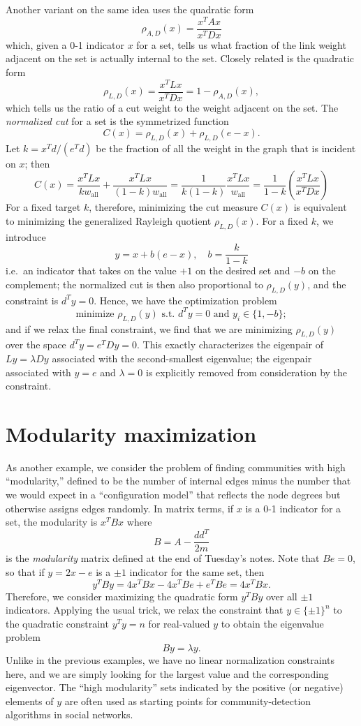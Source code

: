 \documentclass[12pt, leqno]{article} %
\begin{document}
Another variant on the same idea uses the quadratic form
\[
  \rho_{A,D}(x) = \frac{x^T A x}{x^T D x}
\]
which, given a 0-1 indicator $x$ for a set, tells us what fraction of the
link weight adjacent on the set is actually internal to the set.
Closely related is the quadratic form
\[
  \rho_{L,D}(x) = \frac{x^T L x}{x^T D x} = 1 - \rho_{A,D}(x),
\]
which tells us the ratio of a cut weight to the weight adjacent on the
set.  The {\em normalized cut} for a set is the symmetrized function
\[
  C(x) = \rho_{L,D}(x) + \rho_{L,D}(e-x).
\]
Let $k = x^T d / (e^T d)$ be the fraction of all the weight in the
graph that is incident on $x$; then
\[
C(x) = \frac{x^T L x}{k w_{\mbox{all}}} +
       \frac{x^T L x}{(1-k) w_{\mbox{all}}}
       = \frac{1}{k(1-k)} \frac{x^T L x}{w_{\mbox{all}}}
       = \frac{1}{1-k} \left( \frac{x^T L x}{x^T D x} \right)
\]
For a fixed target $k$, therefore, minimizing the cut measure $C(x)$
is equivalent to minimizing the generalized Rayleigh quotient
$\rho_{L,D}(x)$.  For a fixed $k$, we introduce
\[
  y = x + b(e-x), \quad b = \frac{k}{1-k}
\]
i.e.~an indicator that takes on the value $+1$ on the desired set and
$-b$ on the complement; the normalized cut is then also proportional
to $\rho_{L,D}(y)$, and the constraint is $d^T y = 0$.  Hence, we
have the optimization problem
\[
  \mbox{minimize } \rho_{L,D}(y) \mbox{ s.t. } d^T y = 0 \mbox{ and }
  y_i \in \{1, -b\};
\]
and if we relax the final constraint, we find that we are minimizing
$\rho_{L,D}(y)$ over the space $d^T y = e^T D y = 0$.  This exactly
characterizes the eigenpair of $Ly = \lambda D y$ associated with the
second-smallest eigenvalue; the eigenpair associated with
$y = e$ and $\lambda = 0$ is explicitly removed from consideration
by the constraint.

\section{Modularity maximization}

As another example, we consider the problem of finding
communities with high ``modularity,'' defined to be the number
of internal edges minus the number that we would expect in a
``configuration model'' that reflects the node degrees but otherwise
assigns edges randomly.  In matrix terms, if $x$ is a 0-1 indicator
for a set, the modularity is $x^T B x$ where
\[
  B = A-\frac{dd^T}{2m}
\]
is the {\em modularity} matrix defined at the end of Tuesday's notes.
Note that $Be = 0$, so that if $y = 2x-e$ is a $\pm 1$ indicator for
the same set, then
\[
  y^T B y = 4 x^T B x - 4 x^T B e + e^T B e = 4 x^T B x.
\]
Therefore, we consider maximizing the quadratic form $y^T B y$
over all $\pm 1$ indicators.  Applying the usual trick, we relax
the constraint that $y \in \{\pm 1\}^n$ to the quadratic constraint
$y^T y = n$ for real-valued $y$ to obtain the eigenvalue problem
\[
  By = \lambda y.
\]
Unlike in the previous examples, we have no linear normalization
constraints here, and we are simply looking for the largest value
and the corresponding eigenvector.  The ``high modularity'' sets
indicated by the positive (or negative) elements of $y$ are often
used as starting points for community-detection algorithms in social
networks.
\end{document}
